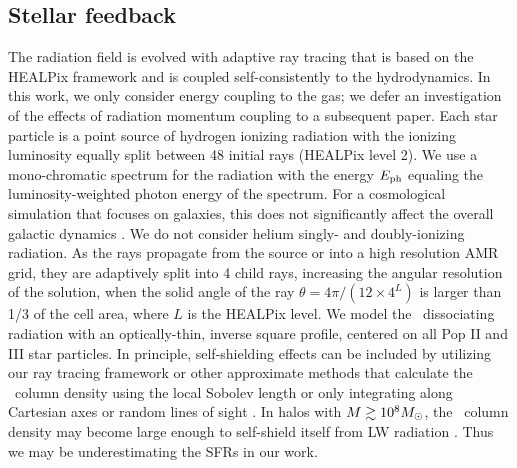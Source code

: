 \documentclass[apjl]{emulateapj}
\begin{document}
\subsection{Stellar feedback}

The radiation field is evolved with adaptive ray tracing
\citep{Abel02_RT, Wise11_Moray} that is based on the HEALPix framework
\citep{HEALPix} and is coupled self-consistently to the hydrodynamics.
In this work, we only consider energy coupling to the gas; we defer an
investigation of the effects of radiation momentum coupling to a
subsequent paper.  Each star particle is a point source of hydrogen
ionizing radiation with the ionizing luminosity equally split between
48 initial rays (HEALPix level 2).  We use a mono-chromatic spectrum
for the radiation with the energy $E_{\rm ph}$ equaling the
luminosity-weighted photon energy of the spectrum.  For a cosmological
simulation that focuses on galaxies, this does not significantly
affect the overall galactic dynamics \citep[see Sec. 6.3
  in][]{Wise11_Moray}.  We do not consider helium singly- and
doubly-ionizing radiation.  As the rays propagate from the source or
into a high resolution AMR grid, they are adaptively split into 4
child rays, increasing the angular resolution of the solution, when
the solid angle of the ray $\theta = 4\pi/(12 \times 4^{L})$ is larger
than 1/3 of the cell area, where $L$ is the HEALPix level.  We model
the \hh~dissociating radiation with an optically-thin, inverse square
profile, centered on all Pop II and III star particles.  In principle,
self-shielding effects can be included by utilizing our ray tracing
framework or other approximate methods that calculate the \hh~column
density using the local Sobolev length \citep{Wolcott11} or only
integrating along Cartesian axes or random lines of sight
\citep{Yoshida03, Yoshida07_HII, Glover07}.  In halos with $M \ga 10^8
\Ms$, the \hh~column density may become large enough to self-shield
itself from LW radiation \citep{Wise08_Gal}.  Thus we may be
underestimating the SFRs in our work.
\end{document}
